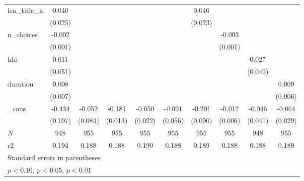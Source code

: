 \begin{table}[htbp]
\begin{tabular}{l*{9}{c}}
len\_title\_k&    0.040         &                  &                  &                  &                  &    0.046\sym{*}  &                  &                  &                  \\
          &  (0.025)         &                  &                  &                  &                  &  (0.023)         &                  &                  &                  \\
n\_choices &   -0.002         &                  &                  &                  &                  &                  &   -0.003\sym{*}  &                  &                  \\
          &  (0.001)         &                  &                  &                  &                  &                  &  (0.001)         &                  &                  \\
hhi       &    0.011         &                  &                  &                  &                  &                  &                  &    0.027         &                  \\
          &  (0.051)         &                  &                  &                  &                  &                  &                  &  (0.049)         &                  \\
duration  &    0.008         &                  &                  &                  &                  &                  &                  &                  &    0.009         \\
          &  (0.007)         &                  &                  &                  &                  &                  &                  &                  &  (0.006)         \\
\_cons    &   -0.434\sym{***}&   -0.052         &   -0.181\sym{***}&   -0.050\sym{**} &   -0.091         &   -0.201\sym{**} &   -0.012\sym{**} &   -0.046         &   -0.064\sym{**} \\
          &  (0.107)         &  (0.084)         &  (0.013)         &  (0.022)         &  (0.056)         &  (0.090)         &  (0.006)         &  (0.041)         &  (0.029)         \\
\hline
\(N\)     &      948         &      955         &      955         &      955         &      955         &      955         &      955         &      948         &      955         \\
r2        &    0.194         &    0.188         &    0.188         &    0.190         &    0.188         &    0.189         &    0.188         &    0.188         &    0.189         \\
\hline\hline
\multicolumn{10}{l}{\footnotesize Standard errors in parentheses}\\
\multicolumn{10}{l}{\footnotesize \sym{*} \(p<0.10\), \sym{**} \(p<0.05\), \sym{***} \(p<0.01\)}\\
\end{tabular}
\end{table}
